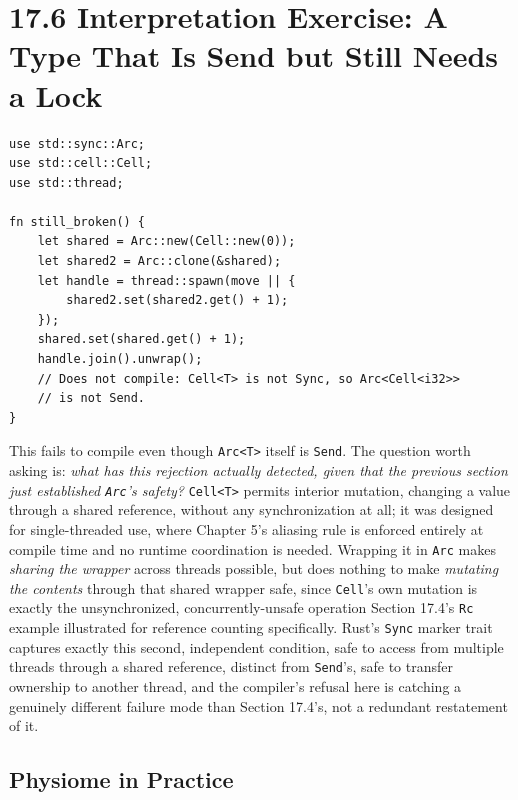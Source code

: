 \documentclass[11pt]{book}
\begin{document}
\section*{17.6 Interpretation Exercise: A Type That Is Send but Still Needs a Lock}

\begin{lstlisting}
use std::sync::Arc;
use std::cell::Cell;
use std::thread;

fn still_broken() {
    let shared = Arc::new(Cell::new(0));
    let shared2 = Arc::clone(&shared);
    let handle = thread::spawn(move || {
        shared2.set(shared2.get() + 1);
    });
    shared.set(shared.get() + 1);
    handle.join().unwrap();
    // Does not compile: Cell<T> is not Sync, so Arc<Cell<i32>>
    // is not Send.
}
\end{lstlisting}

This fails to compile even though \texttt{Arc<T>} itself is \texttt{Send}. The question worth asking is: \emph{what has this rejection actually detected, given that the previous section just established \texttt{Arc}'s safety?} \texttt{Cell<T>} permits interior mutation, changing a value through a shared reference, without any synchronization at all; it was designed for single-threaded use, where Chapter 5's aliasing rule is enforced entirely at compile time and no runtime coordination is needed. Wrapping it in \texttt{Arc} makes \emph{sharing the wrapper} across threads possible, but does nothing to make \emph{mutating the contents} through that shared wrapper safe, since \texttt{Cell}'s own mutation is exactly the unsynchronized, concurrently-unsafe operation Section 17.4's \texttt{Rc} example illustrated for reference counting specifically. Rust's \texttt{Sync} marker trait captures exactly this second, independent condition, safe to access from multiple threads through a shared reference, distinct from \texttt{Send}'s, safe to transfer ownership to another thread, and the compiler's refusal here is catching a genuinely different failure mode than Section 17.4's, not a redundant restatement of it.

\subsection*{Physiome in Practice}
\end{document}
